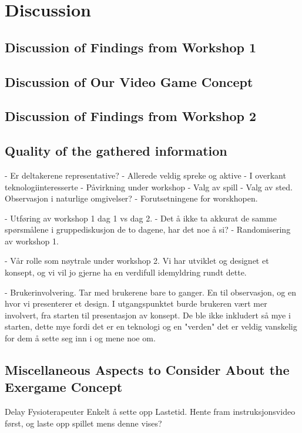 \chapter{Discussion}
\label{chap:discussion}

\section{Discussion of Findings from Workshop 1}

\section{Discussion of Our Video Game Concept}

\section{Discussion of Findings from Workshop 2}

\section{Quality of the gathered information}
- Er deltakerene representative?
	- Allerede veldig spreke og aktive
	- I overkant teknologiinteresserte
- Påvirkning under workshop
- Valg av spill
- Valg av sted. Observasjon i naturlige omgivelser?
- Forutsetningene for worskhopen. 

- Utføring av workshop 1 dag 1 vs dag 2.
- Det å ikke ta akkurat de samme spørsmålene i gruppediskusjon de to dagene, har det noe å si?
- Randomisering av workshop 1. 

- Vår rolle som nøytrale under workshop 2. Vi har utviklet og designet et konsept, og vi vil jo gjerne ha en verdifull idemyldring rundt dette.  

- Brukerinvolvering. Tar med brukerene bare to ganger. En til observasjon, og en hvor vi presenterer et design. I utgangspunktet burde brukeren vært mer involvert, fra starten til presentasjon av konsept. De ble ikke inkludert så mye i starten, dette mye fordi det er en teknologi og en "verden" det er veldig vanskelig for dem å sette seg inn i og mene noe om. 


\section{Miscellaneous Aspects to Consider About the Exergame Concept}
\label{sec:misc}

Delay
Fysioterapeuter
Enkelt å sette opp
Lastetid. Hente fram instruksjonsvideo først, og laste opp spillet mens denne vises?

